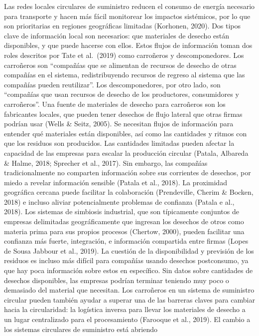 \documentclass[runningheads]{llncs}
\begin{document}
Las redes locales circulares de suministro reducen el consumo de energía
necesario para transporte y hacen más fácil monitorear los impactos
sistémicos, por lo que son prioritarias en regiones geográficas
limitadas (Korhonen, 2020). Dos tipos clave de información local son
necesarios: que materiales de desecho están disponibles, y que puede
hacerse con ellos. Estos flujos de información toman dos roles descritos
por Tate et al.~(2019) como carroñeros y descomponedores. Los carroñeros
son ``compañías que se alimentan de recursos de desecho de otras
compañías en el sistema, redistribuyendo recursos de regreso al sistema
que las compañías pueden reutilizar''. Los descomponedores, por otro
lado, son ``compañías que usan recursos de desecho de los productores,
consumidores y carroñeros''. Una fuente de materiales de desecho para
carroñeros son los fabricantes locales, que pueden tener desechos de
flujo lateral que otras firmas podrían usar (Wells \& Seitz, 2005). Se
necesitan flujos de información para entender qué materiales están
disponibles, así como las cantidades y ritmos con que los residuos son
producidos. Las cantidades limitadas pueden afectar la capacidad de las
empresas para escalar la producción circular (Patala, Albareda \& Halme,
2018; Sprecher et al., 2017). Sin embargo, las compañías
tradicionalmente no comparten información sobre sus corrientes de
desechos, por miedo a revelar información sensible (Patala et al.,
2018). La proximidad geográfica cercana puede facilitar la colaboración
(Prendeville, Cherim \& Bocken, 2018) e incluso aliviar potencialmente
problemas de confianza (Patala e al., 2018). Los sistemas de simbiosis
industrial, que son típicamente conjuntos de empresas delimitadas
geográficamente que ingresan los desechos de otros como materia prima
para sus propios procesos (Chertow, 2000), pueden facilitar una
confianza más fuerte, integración, e información compartida entre firmas
(Lopes de Sousa Jabbour et al., 2019). La cuestión de la disponibilidad
y previsión de los residuos es incluso más difícil para compañías usando
desechos postconsumo, ya que hay poca información sobre estos en
específico. Sin datos sobre cantidades de desechos disponibles, las
empresas podrían terminar teniendo muy poco o demasiado del material que
necesitan. Los carroñeros en un sistema de suministro circular pueden
también ayudar a superar una de las barreras claves para cambiar hacia
la circularidad: la logística inversa para llevar los materiales de
desecho a un lugar centralizado para el procesamiento (Farooque et al.,
2019). El cambio a los sistemas circulares de suministro está abriendo
\end{document}

